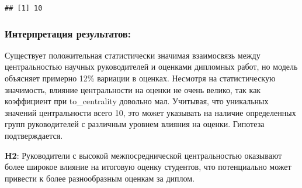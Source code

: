 \documentclass[
]{article}
\newenvironment{Shaded}{\begin{snugshade}}{\end{snugshade}}
\newcommand{\AttributeTok}[1]{\textcolor[rgb]{0.13,0.29,0.53}{#1}}
\newcommand{\FunctionTok}[1]{\textcolor[rgb]{0.13,0.29,0.53}{\textbf{#1}}}
\newcommand{\NormalTok}[1]{#1}
\newcommand{\OtherTok}[1]{\textcolor[rgb]{0.56,0.35,0.01}{#1}}
\newcommand{\SpecialCharTok}[1]{\textcolor[rgb]{0.81,0.36,0.00}{\textbf{#1}}}
\begin{document}
\begin{verbatim}
## [1] 10
\end{verbatim}

\hypertarget{ux438ux43dux442ux435ux440ux43fux440ux435ux442ux430ux446ux438ux44f-ux440ux435ux437ux443ux43bux44cux442ux430ux442ux43eux432-3}{%
\subsubsection{Интерпретация
результатов:}\label{ux438ux43dux442ux435ux440ux43fux440ux435ux442ux430ux446ux438ux44f-ux440ux435ux437ux443ux43bux44cux442ux430ux442ux43eux432-3}}

Существует положительная статистически значимая взаимосвязь между
центральностью научных руководителей и оценками дипломных работ, но
модель объясняет примерно 12\% вариации в оценках. Несмотря на
статистическую значимость, влияние центральности на оценки не очень
велико, так как коэффициент при to\_centrality довольно мал. Учитывая,
что уникальных значений центральности всего 10, это может указывать на
наличие определенных групп руководителей с различным уровнем влияния на
оценки. Гипотеза подтверждается.

\textbf{H2}: Руководители с высокой межпосреднической центральностью
оказывают более широкое влияние на итоговую оценку студентов, что
потенциально может привести к более разнообразным оценкам за диплом.

\begin{Shaded}
\end{Shaded}
\end{document}
